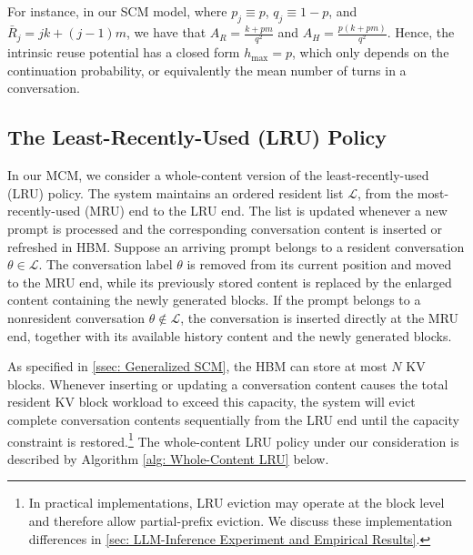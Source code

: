 \documentclass{article}
\theoremstyle{definition}
\begin{document}
For instance, in our SCM model, where $p_j \equiv p$, $q_j \equiv 1-p$, and $\bar R_j = jk+(j-1)m$, we have that $A_R = \frac{k+pm}{q^2}$ and $A_H = \frac{p(k+pm)}{q^2}$. Hence, the intrinsic reuse potential has a closed form $h_{\max} = p$, which only depends on the continuation probability, or equivalently the mean number of turns in a conversation.



\subsection{The Least-Recently-Used (LRU) Policy}
\label{ssec: The LRU Policy}

In our MCM, we consider a whole-content version of the least-recently-used (LRU) policy. The system maintains an ordered resident list $\mathcal L$, from the most-recently-used (MRU) end to the LRU end. The list is updated whenever a new prompt is processed and the corresponding conversation content is inserted or refreshed in HBM. Suppose an arriving prompt belongs to a resident conversation $\theta\in\mathcal L$. The conversation label $\theta$ is removed from its current position and moved to the MRU end, while its previously stored content is replaced by the enlarged content containing the newly generated blocks. If the prompt belongs to a nonresident conversation $\theta\notin\mathcal L$, the conversation is inserted directly at the MRU end, together with its available history content and the newly generated blocks.


As specified in \cref{ssec: Generalized SCM}, the HBM can store at most $N$ KV blocks. Whenever inserting or updating a conversation content causes the total resident KV block workload to exceed this capacity, the system will evict complete conversation contents sequentially from the LRU end until the capacity constraint is restored.\footnote{In practical implementations, LRU eviction may operate at the block level and therefore allow partial-prefix eviction. We discuss these implementation differences in \cref{sec: LLM-Inference Experiment and Empirical Results}.} The whole-content LRU policy under our consideration is described by Algorithm \ref{alg: Whole-Content LRU} below. 
\end{document}
